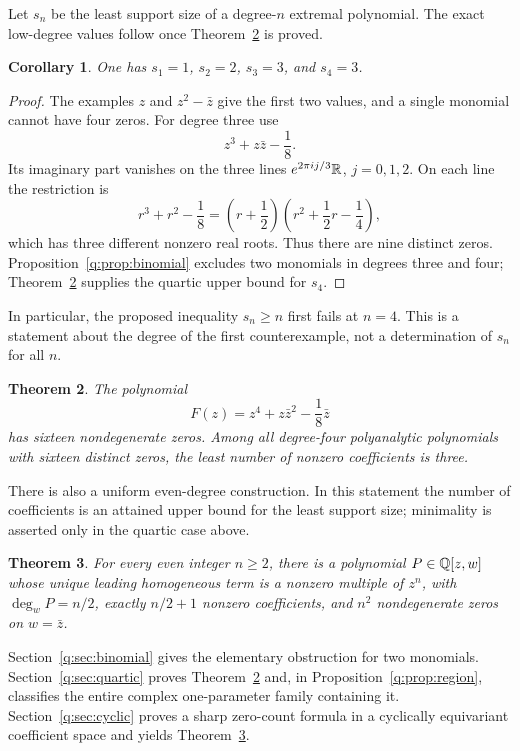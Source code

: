 \documentclass[UTF8,11pt]{ctexart}
\newtheorem{thm}{Theorem}[section]
\newtheorem{cor}[thm]{Corollary}
\theoremstyle{definition}
\numberwithin{equation}{section}
\begin{document}
Let $s_n$ be the least support size of a degree-$n$ extremal polynomial.
The exact low-degree values follow once Theorem~\ref{q:thm:quartic} is proved.
\begin{cor}\label{q:cor:minimaldegree}
One has $s_1=1$, $s_2=2$, $s_3=3$, and $s_4=3$.
\end{cor}
\begin{proof}
The examples $z$ and $z^2-\bar z$ give the first two values, and a single
monomial cannot have four zeros. For degree three use
\[
 z^3+z\bar z-\frac18.
\]
Its imaginary part vanishes on the three lines $e^{2\pi ij/3}\mathbb R$,
$j=0,1,2$. On each line the restriction is
\[
 r^3+r^2-\frac18
 =\left(r+\frac12\right)
   \left(r^2+\frac12r-\frac14\right),
\]
which has three different nonzero real roots. Thus there are nine
distinct zeros. Proposition~\ref{q:prop:binomial} excludes two monomials
in degrees three and four; Theorem~\ref{q:thm:quartic} supplies the
quartic upper bound for $s_4$.
\end{proof}

In particular, the proposed inequality $s_n\ge n$ first fails at
$n=4$. This is a statement about the degree of the first counterexample,
not a determination of $s_n$ for all $n$.

\begin{thm}\label{q:thm:quartic}
The polynomial
\begin{equation}\label{q:eq:quartic}
 F(z)=z^4+z\bar z^2-\frac18\bar z
\end{equation}
has sixteen nondegenerate zeros. Among all degree-four polyanalytic
polynomials with sixteen distinct zeros, the least number of nonzero
coefficients is three.
\end{thm}

There is also a uniform even-degree construction. In this statement the
number of coefficients is an attained upper bound for the least support
size; minimality is asserted only in the quartic case above.
\begin{thm}\label{q:thm:even}
For every even integer $n\ge2$, there is a polynomial
$P\in\mathbb Q[z,w]$ whose unique leading homogeneous term is a nonzero multiple
of $z^n$, with $\deg_wP=n/2$, exactly $n/2+1$ nonzero coefficients, and
$n^2$ nondegenerate zeros on $w=\bar z$.
\end{thm}

Section~\ref{q:sec:binomial} gives the elementary obstruction for two
monomials. Section~\ref{q:sec:quartic} proves Theorem~\ref{q:thm:quartic}
and, in Proposition~\ref{q:prop:region}, classifies the entire complex
one-parameter family containing it.
Section~\ref{q:sec:cyclic} proves a sharp zero-count formula in a cyclically
equivariant coefficient space and yields Theorem~\ref{q:thm:even}.
\end{document}
